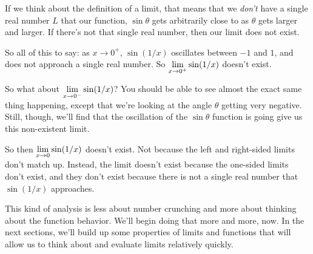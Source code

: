 If we think about the definition of a limit, that means that we \textit{don't} have a single real number $L$ that our function, $\sin\theta$ gets arbitrarily close to as $\theta$ gets larger and larger.
If there's not that single real number, then our limit does not exist.

So all of this to say: as $x\to 0^+$, $\sin(1/x)$ oscillates between $-1$ and $1$, and does not approach a single real number.
So $\displaystyle \lim_{x\to 0^+} \sin(1/x)$ doesn't exist.

So what about $\displaystyle \lim_{x\to 0^-} \sin(1/x)$?
You should be able to see almost the exact same thing happening, except that we're looking at the angle $\theta$ getting very negative.
Still, though, we'll find that the oscillation of the $\sin\theta$ function is going give us this non-existent limit.

So then $\displaystyle \lim_{x\to0} \sin(1/x)$ doesn't exist.
Not because the left and right-sided limits don't match up.
Instead, the limit doesn't exist because the one-sided limits don't exist, and they don't exist because there is not a single real number that $\sin(1/x)$ approaches.

This kind of analysis is less about number crunching and more about thinking about the function behavior.
We'll begin doing that more and more, now.
In the next sections, we'll build up some properties of limits and functions that will allow us to think about and evaluate limits relatively quickly.
